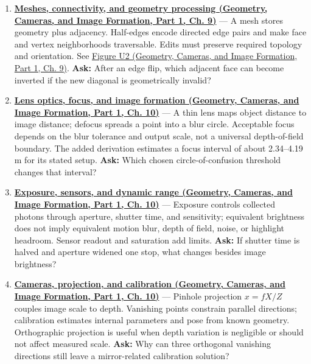 \begin{enumerate}
\item
  \textbf{\href{../03-Geometry-Cameras-and-Image-Formation-P01/main.pdf\#03-visual-computing-i-ch002-meshes-connectivity-and-geometry-processing}{Meshes, connectivity, and geometry processing (Geometry, Cameras, and Image Formation, Part 1, Ch. 9)}} --- A mesh stores geometry plus adjacency. Half-edges encode directed edge pairs and make face and vertex neighborhoods traversable. Edits must preserve required topology and orientation. See \href{../03-Geometry-Cameras-and-Image-Formation-P01/main.pdf\#03-visual-computing-i-ch002-figure-u2---a-half-edge-separates-face-traversal-from-edge-traversal}{Figure U2 (Geometry, Cameras, and Image Formation, Part 1, Ch. 9)}. \textbf{Ask:} After an edge flip, which adjacent face can become inverted if the new diagonal is geometrically invalid?
\item
  \textbf{\href{../03-Geometry-Cameras-and-Image-Formation-P01/main.pdf\#03-visual-computing-i-ch003-lens-optics-focus-and-image-formation}{Lens optics, focus, and image formation (Geometry, Cameras, and Image Formation, Part 1, Ch. 10)}} --- A thin lens maps object distance to image distance; defocus spreads a point into a blur circle. Acceptable focus depends on the blur tolerance and output scale, not a universal depth-of-field boundary. The added derivation estimates a focus interval of about 2.34--4.19 m for its stated setup. \textbf{Ask:} Which chosen circle-of-confusion threshold changes that interval?
\item
  \textbf{\href{../03-Geometry-Cameras-and-Image-Formation-P01/main.pdf\#03-visual-computing-i-ch003-exposure-sensors-and-dynamic-range}{Exposure, sensors, and dynamic range (Geometry, Cameras, and Image Formation, Part 1, Ch. 10)}} --- Exposure controls collected photons through aperture, shutter time, and sensitivity; equivalent brightness does not imply equivalent motion blur, depth of field, noise, or highlight headroom. Sensor readout and saturation add limits. \textbf{Ask:} If shutter time is halved and aperture widened one stop, what changes besides image brightness?
\item
  \textbf{\href{../03-Geometry-Cameras-and-Image-Formation-P01/main.pdf\#03-visual-computing-i-ch003-cameras-projection-and-calibration}{Cameras, projection, and calibration (Geometry, Cameras, and Image Formation, Part 1, Ch. 10)}} --- Pinhole projection \(x=fX/Z\) couples image scale to depth. Vanishing points constrain parallel directions; calibration estimates internal parameters and pose from known geometry. Orthographic projection is useful when depth variation is negligible or should not affect measured scale. \textbf{Ask:} Why can three orthogonal vanishing directions still leave a mirror-related calibration solution?

\end{enumerate}
